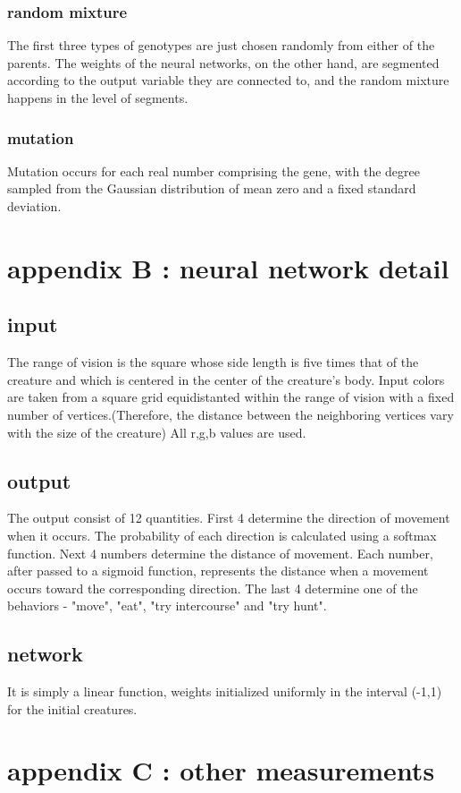 \documentclass{amsart}
\theoremstyle{definition}
\theoremstyle{remark}
\numberwithin{equation}{section}
\begin{document}
\subsubsection{random mixture}
The first three types of genotypes are just chosen randomly from either of the parents. The weights of the neural networks, on the other hand, are segmented according to the output variable they are connected to, and the random mixture happens in the level of segments. 
\subsubsection{mutation}
Mutation occurs for each real number comprising the gene, with the degree sampled from the Gaussian distribution of mean zero and a fixed standard deviation. 


\section{appendix B : neural network detail}
\subsection{input}
The range of vision is the square whose side length is five times that of the creature and which is centered in the center of the creature's body. Input colors are taken from a square grid equidistanted within the range of vision with a fixed number of vertices.(Therefore, the distance between the neighboring vertices vary with the size of the creature) All r,g,b values are used.   
\subsection{output}
The output consist of 12 quantities. First 4 determine the direction of movement when it occurs. The probability of each direction is calculated using a softmax function. Next 4 numbers determine the distance of movement. Each number, after passed to a sigmoid function, represents the distance when a movement occurs toward the corresponding direction. The last 4 determine one of the behaviors - "move", "eat", "try intercourse" and "try hunt".  
\subsection{network} 
It is simply a linear function, weights initialized uniformly in the interval (-1,1) for the initial creatures.


\section{appendix C : other measurements}
\end{document}
